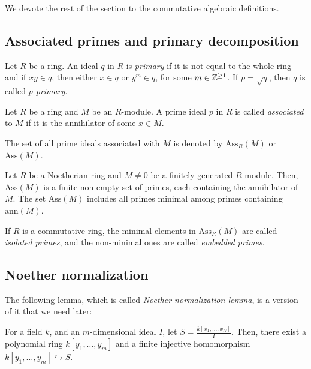 \documentclass[11pt,a4paper,leqno,noamsfonts]{amsart}
\numberwithin{equation}{section}
\begin{document}
 We devote the rest of the section to the commutative algebraic definitions.
\subsection{Associated primes and primary decomposition}

\begin{definition}\cite[Chapter 4]{Atiyah-MacDonaldMacDonald} Let $R$ be a ring. An ideal $q$ in $R$ is \textit{primary} if it is not equal to the whole ring and if $xy\in q$, then either $x\in q$ or $y^m\in q$, for some $m\in{\mathbb{Z}}^{\geq 1}$. If $p=\sqrt q$, then $q$ is called \textit{$p$-primary}.
\end{definition}
\begin{definition}\cite[Section 3.1]{Eisenbudcomm} Let $R$ be a ring and $M$ be an $R$-module. A prime ideal $p$ in $R$ is called \textit{associated} to $M$ if it is the annihilator of some $x\in M$.    
\end{definition}
The set of all prime ideals associated with $M$ is denoted by $\mathrm{Ass}_R(M)$ or $\mathrm{Ass}(M)$.
\begin{lemma}\cite[Theorem 3.1]{Eisenbudcomm} Let $R$ be a Noetherian ring and $M\neq0$ be a finitely generated $R$-module. Then, $\mathrm{Ass}(M)$ is a finite non-empty set of primes, each containing the annihilator of $M$. The set $\mathrm{Ass}(M)$ includes all primes minimal among primes containing $\mathrm{ann}(M)$. 
    
\end{lemma}

If $R$ is a commutative ring, the minimal elements in $\mathrm{Ass}_R(M)$ are called \textit{isolated primes}, and the non-minimal ones are called \textit{embedded primes}.



\subsection{Noether normalization}
The following lemma, which is called \textit{Noether normalization lemma}, is a version of it that we need later:
\begin{lemma}\cite[Lemma 10.115.4]{stacks-project} \label{noetherNormalization}
    For a field $k$, and an $m$-dimensional ideal $I$, let $S=\frac{k[x_1,\ldots,x_N]}{I}$. Then, there exist a polynomial ring $k[y_1,\ldots,y_m]$ and a finite injective homomorphism $k[y_1,\ldots,y_m] \hookrightarrow S$.
\end{lemma}
\end{document}

